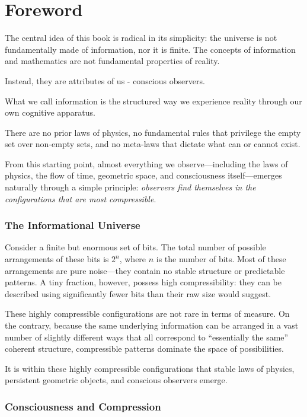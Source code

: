 \chapter*{Foreword}

The central idea of this book is radical in its simplicity: the universe is not fundamentally made of information, nor it is finite. The concepts of
information and mathematics are not fundamental properties of reality.

Instead, they are attributes of us - conscious observers.

What we call information is the structured way we experience reality through our own cognitive apparatus.

There are no prior laws of physics, no fundamental rules that privilege the empty set over non-empty sets, and no meta-laws that dictate what can or cannot exist. 

From this starting point, almost everything we observe---including the laws of physics, the flow of time, geometric space, and consciousness itself---emerges naturally through a simple principle: \emph{observers find themselves in the configurations that are most compressible}.

\subsection*{The Informational Universe}

Consider a finite but enormous set of bits. The total number of possible arrangements of these bits is $2^n$, where $n$ is the number of bits. Most of these arrangements are pure noise---they contain no stable structure or predictable patterns. A tiny fraction, however, possess high compressibility: they can be described using significantly fewer bits than their raw size would suggest.

These highly compressible configurations are not rare in terms of measure. On the contrary, because the same underlying information can be arranged in a vast number of slightly different ways that all correspond to ``essentially the same'' coherent structure, compressible patterns dominate the space of possibilities.

It is within these highly compressible configurations that stable laws of physics, persistent geometric objects, and conscious observers emerge.

\subsection*{Consciousness and Compression}

